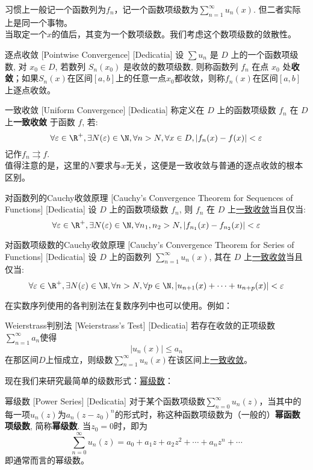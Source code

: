 \documentclass[UTF8]{ctexart}
\newcommand{\PowerSeries}{\hyperref[dfn:PowerSeries]{幂级数}}
\newcommand{\UniformConvergence}{\hyperref[dfn:UniformConvergence]{一致收敛}}
\begin{document}
习惯上一般记一个函数列为$f_n$，记一个函数项级数为$\sum_{n = 1}^{\infty} u_n(x) $. 但二者实际上是同一个事物。\\
当取定一个$x$的值后，其变为一个数项级数。我们考虑这个数项级数的敛散性。
\begin{dfn}
    [UUID]
    {逐点收敛}
    [Pointwise Convergence]
    [Dedicatia]
    设 \(\sum u_n\) 是 \(D\) 上的一个函数项级数, 对 \(x_0\in D\), 若数列 \(S_n(x_0)\) 是收敛的数项级数, 则称函数列 \(f_n\) 在点 \(x_0\) 处\textbf{收敛}；如果$S_n(x)$在区间$[a,b]$上的任意一点$x_0$都收敛，则称$f_n(x)$在区间$[a,b]$上逐点收敛。
\end{dfn}
\begin{dfn}
    [UniformConvergence]
    {一致收敛}
    [Uniform Convergence]
    [Dedicatia]
    称定义在 \(D\) 上的函数项级数 \(f_n\) 在 \(D\) 上\textbf{一致收敛} 于函数 \(f\), 若: 
    \[\forall\varepsilon\in\R^+, \exists N(\varepsilon)\in\N, \forall n>N, \forall x\in D, |f_n(x)-f(x)|<\varepsilon\]
    记作$f_n\rightrightarrows f$.\\
    值得注意的是，这里的$N$要求与$x$无关，这便是一致收敛与普通的逐点收敛的根本区别。
\end{dfn}
\begin{crl}
    [UUID]
    {对函数列的Cauchy收敛原理}
    [Cauchy's Convergence Theorem for Sequences of Functions]
    [Dedicatia]
    设 \(D\) 上的函数项级数 \(f_n\), 则 \(f_n\) 在 \(D\) 上\UniformConvergence 当且仅当: 
	\[\forall\varepsilon\in\R^+, \exists N(\varepsilon)\in\N, \forall n_1,n_2>N, |f_{n_1}(x)-f_{n_2}(x)|<\varepsilon\]
\end{crl}
\begin{crl}
    [UUID]
    {对函数项级数的Cauchy收敛原理}
    [Cauchy's Convergence Theorem for Series of Functions]
    [Dedicatia]
    设 \(D\) 上的函数列 \(\sum_{n=1}^{\infty} u_n(x)\), 其在 \(D\) 上\UniformConvergence 当且仅当: 
	\[\forall\varepsilon\in\R^+, \exists N(\varepsilon)\in\N, \forall n>N, \forall p\in\N, |u_{n+1}(x)+\cdots+u_{n+p}(x)|<\varepsilon\]
\end{crl}
在实数序列使用的各判别法在复数序列中也可以使用。例如：
\begin{thm}
    [UUID]
    {Weierstrass判别法}
    [Weierstrass's Test]
    [Dedicatia]
    若存在收敛的正项级数$\sum_{n = 1}^{\infty} a_n $使得\[|u_n(x)|\leqslant a_n\]
    在那区间$D$上恒成立，则级数$\sum_{n = 1}^{\infty} u_n(x) $在该区间上\UniformConvergence 。
\end{thm}
现在我们来研究最简单的级数形式：\PowerSeries ：
\begin{dfn}
    [PowerSeries]
    {幂级数}
    [Power Series]
    [Dedicatia]
    对于某个函数项级数$\sum_{n = 0}^{\infty} u_n(z) $，当其中的每一项$u_n(z)$为$a_n(z-z_0)^n$的形式时，称这种函数项级数为（一般的）\textbf{幂函数项级数}, 简称\textbf{幂级数}. 当$z_0=0$时，即为
    \[\sum_{n = 0}^{\infty} u_n(z)=a_0+a_1z+a_2z^2+\cdots+a_nz^n+\cdots \tag{$\star$}\]
    即通常而言的幂级数。
\end{dfn}
\end{document}
